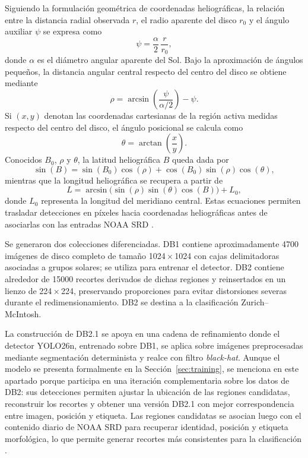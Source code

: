Siguiendo la formulación geométrica de coordenadas heliográficas, la relación
entre la distancia radial observada $r$, el radio aparente del disco $r_0$ y el
ángulo auxiliar $\psi$ se expresa como
\begin{equation}
\psi = \frac{\alpha}{2}\,\frac{r}{r_0},
\end{equation}
donde $\alpha$ es el diámetro angular aparente del Sol. Bajo la aproximación de
ángulos pequeños, la distancia angular central respecto del centro del disco se
obtiene mediante
\begin{equation}
\rho = \arcsin\!\left(\frac{\psi}{\alpha/2}\right) - \psi.
\end{equation}
Si $(x,y)$ denotan las coordenadas cartesianas de la región activa medidas
respecto del centro del disco, el ángulo posicional se calcula como
\begin{equation}
\theta = \arctan\!\left(\frac{x}{y}\right).
\end{equation}
Conocidos $B_0$, $\rho$ y $\theta$, la latitud heliográfica $B$ queda dada por
\begin{equation}
\sin(B) = \sin(B_0)\cos(\rho) + \cos(B_0)\sin(\rho)\cos(\theta),
\end{equation}
mientras que la longitud heliográfica se recupera a partir de
\begin{equation}
L = \arcsin\!\big(\sin(\rho)\sin(\theta)\cos(B)\big) + L_0,
\end{equation}
donde $L_0$ representa la longitud del meridiano central. Estas ecuaciones
permiten trasladar detecciones en píxeles hacia coordenadas heliográficas antes
de asociarlas con las entradas NOAA SRD \citep{cesarHeliographic,noaaSRS}.

Se generaron dos colecciones diferenciadas. DB1 contiene aproximadamente 4700
imágenes de disco completo de tamaño 1024\,$\times$\,1024 con cajas delimitadoras
asociadas a grupos solares; se utiliza para entrenar el detector. DB2 contiene
alrededor de 15000 recortes derivados de dichas regiones y reinsertados en un
lienzo de 224\,$\times$\,224, preservando proporciones para evitar distorsiones
severas durante el redimensionamiento. DB2 se destina a la clasificación
Zurich--McIntosh.

La construcción de DB2.1 se apoya en una cadena de refinamiento donde el
detector YOLO26n, entrenado sobre DB1, se aplica sobre imágenes preprocesadas
mediante segmentación determinista y realce con filtro \textit{black-hat}. Aunque
el modelo se presenta formalmente en la Sección~\ref{sec:training}, se menciona
en este apartado porque participa en una iteración complementaria sobre los datos
de DB2: sus detecciones permiten ajustar la ubicación de las regiones candidatas,
reconstruir los recortes y obtener una versión DB2.1 con mejor correspondencia
entre imagen, posición y etiqueta. Las regiones candidatas se asocian luego con
el contenido diario de NOAA SRD para recuperar identidad, posición y etiqueta
morfológica, lo que permite generar recortes más consistentes para la
clasificación \citep{sayez2023sunscc,zhou2023mcintosh,noaaSRS}.

